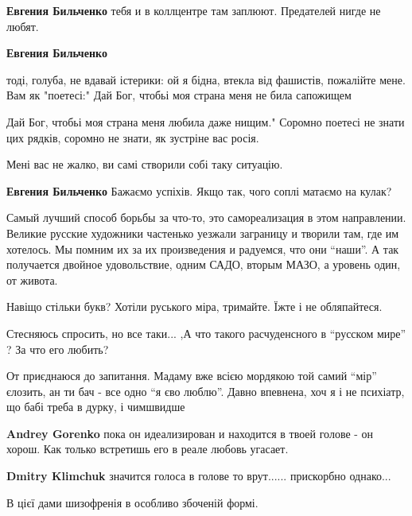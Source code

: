 \begin{itemize}
\begin{itemize}
\textbf{Евгения Бильченко} тебя и в коллцентре там заплюют. Предателей нигде не любят.

\textbf{Евгения Бильченко} 

тоді, голуба, не вдавай істерики: ой я бідна, втекла від фашистів, пожалійте
мене. Вам як "поетесі:" Дай Бог, чтобьі моя страна меня не била сапожищем

Дай Бог, чтобьі моя страна меня любила даже нищим." Соромно поетесі не знати
цих рядків, соромно не знати, як зустріне вас росія.

Мені вас не жалко, ви самі створили собі таку ситуацію.

\textbf{Евгения Бильченко} Бажаємо успіхів. Якщо так, чого соплі матаємо на кулак?

\end{itemize} %


Самый лучший способ борьбы за что-то, это самореализация в этом направлении.
Великие русские художники частенько уезжали заграницу и творили там, где им
хотелось. Мы помним их за их произведения и радуемся, что они \enquote{наши}. А так
получается двойное удовольствие, одним САДО, вторым МАЗО, а уровень один, от
живота.


Навіщо стільки букв? Хотіли руського міра, тримайте. Їжте і не обляпайтеся.


Стесняюсь спросить, но все таки... ,А что такого расчуденсного в \enquote{русском мире}
? За что его любить?

\begin{itemize} %

От приєднаюся до запитання. Мадаму вже всією мордякою той самий \enquote{мір} єлозить, ан ти бач - все одно \enquote{я єво люблю}.
Давно впевнена, хоч я і не психіатр, що бабі треба в дурку, і чимшвидше

\textbf{Andrey Gorenko} пока он идеализирован и находится в твоей голове - он хорош.
Как только встретишь его в реале любовь угасает.

\textbf{Dmitry Klimchuk} значится голоса в голове то врут...... прискорбно однако...
\end{itemize} %

В цієї дами шизофренія в особливо збоченій формі.


\end{itemize}
